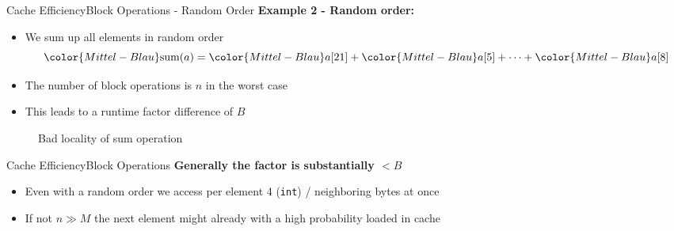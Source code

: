 \begin{frame}{Cache Efficiency}{Block Operations - Random Order}
  \textbf{Example 2 - Random order:}
  \begin{itemize}
    \item<2->
      We sum up all elements in {\color{Mittel-Blau}random order}
      \begin{displaymath}
        {\color{Mittel-Blau}\mathrm{sum}(a)} =
        {\color{Mittel-Blau}a[21]} +
        {\color{Mittel-Blau}a[5]} +
        \dots +
        {\color{Mittel-Blau}a[8]}
      \end{displaymath}
    \item<3->
      The number of block operations is {\color{Mittel-Blau}$n$} in the
      {\color{Mittel-Blau}worst case}
    \item<4->
      This leads to a runtime factor difference of {\color{Mittel-Blau}$B$}
  \end{itemize}
   \vspace{-1.0em}
  \begin{figure}%
    \begin{adjustbox}{width=\linewidth}%
    \end{adjustbox}%
    \caption{Bad locality of sum operation}
    \label{fig:caching:memory_locality_random}
  \end{figure}%
  \vspace{-1.0em}
\end{frame}


\begin{frame}{Cache Efficiency}{Block Operations}
  \textbf{Generally the factor is substantially {\color{Mittel-Blau}$< B$}}
  \begin{itemize}
    \item<2->
      Even with a {\color{Mittel-Blau}random order} we access per element 4 (\texttt{int}) /
      neighboring bytes at once
    \item<3->
      If {\color{Mittel-Blau}not $n \gg M$} the next element might already
      with a high probability loaded in cache
  \end{itemize}
\end{frame}


